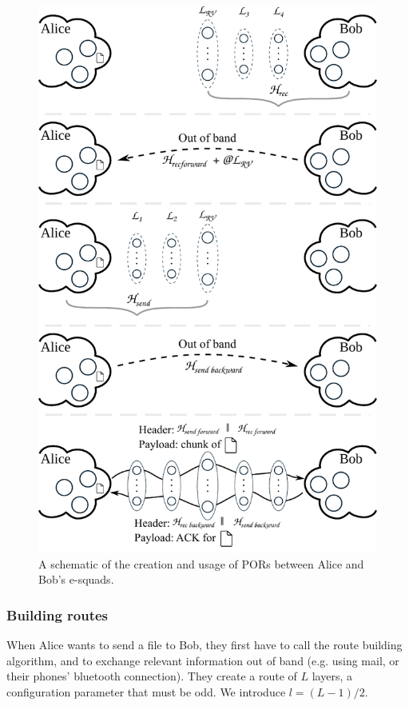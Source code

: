 \begin{figure}[t]
  \includegraphics[width=\linewidth]{figures/file_exchange.pdf}
  \caption{\label{fig:file-exchange}A schematic of the creation and usage of PORs between Alice and Bob's e-squads.}
\end{figure}

\subsubsection{Building routes} 
\label{ssub:building_routes}



When Alice wants to send a file to Bob, they first have to call the route building algorithm, and to exchange relevant information out of band (e.g. using mail, or their phones' bluetooth connection).
They create a route of $L$ layers, a configuration parameter that must be odd. We introduce $l=(L-1)/2$.

